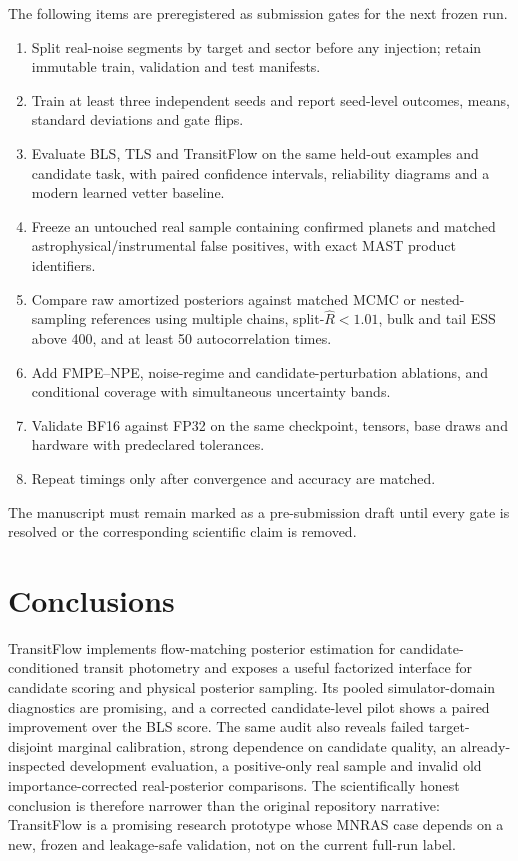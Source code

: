 \documentclass[fleqn,usenatbib]{mnras}
\begin{document}
The following items are preregistered as submission gates for the next frozen
run.
\begin{enumerate}
 \item Split real-noise segments by target and sector before any injection;
 retain immutable train, validation and test manifests.
 \item Train at least three independent seeds and report seed-level outcomes,
 means, standard deviations and gate flips.
 \item Evaluate BLS, TLS and TransitFlow on the same held-out examples and
 candidate task, with paired confidence intervals, reliability diagrams and a
 modern learned vetter baseline.
 \item Freeze an untouched real sample containing confirmed planets and matched
 astrophysical/instrumental false positives, with exact MAST product identifiers.
 \item Compare raw amortized posteriors against matched MCMC or nested-sampling
 references using multiple chains, split-$\hat R<1.01$, bulk and tail ESS above
 400, and at least 50 autocorrelation times.
 \item Add FMPE--NPE, noise-regime and candidate-perturbation ablations, and
 conditional coverage with simultaneous uncertainty bands.
 \item Validate BF16 against FP32 on the same checkpoint, tensors, base draws and
 hardware with predeclared tolerances.
 \item Repeat timings only after convergence and accuracy are matched.
\end{enumerate}
The manuscript must remain marked as a pre-submission draft until every gate is
resolved or the corresponding scientific claim is removed.

\section{Conclusions}
\label{sec:conclusions}

TransitFlow implements flow-matching posterior estimation for
candidate-conditioned transit photometry and exposes a useful factorized
interface for candidate scoring and physical posterior sampling. Its pooled
simulator-domain diagnostics are promising, and a corrected candidate-level
pilot shows a paired improvement over the BLS score. The same audit also reveals
failed target-disjoint marginal calibration, strong dependence on candidate
quality, an already-inspected development evaluation, a positive-only real sample and invalid old
importance-corrected real-posterior comparisons. The scientifically honest
conclusion is therefore narrower than the original repository narrative:
TransitFlow is a promising research prototype whose MNRAS case depends on a new,
frozen and leakage-safe validation, not on the current full-run label.
\end{document}
